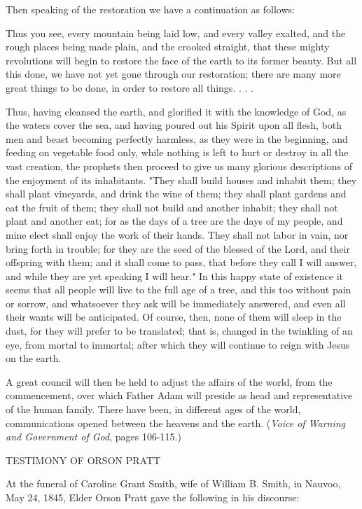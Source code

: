 Then speaking of the restoration we have a continuation as follows:

Thus you see, every mountain being laid low, and every valley exalted, and the rough places
being made plain, and the crooked straight, that these mighty revolutions will begin to restore
the face of the earth to its former beauty. But all this done, we have not yet gone through our
restoration; there are many more great things to be done, in order to restore all things. . . .

Thus, having cleansed the earth, and glorified it with the knowledge of God, as the waters
cover the sea, and having poured out his Spirit upon all flesh, both men and beast becoming
perfectly harmless, as they were in the beginning, and feeding on vegetable food only, while
nothing is left to hurt or destroy in all the vast creation, the prophets then proceed to give us
many glorious descriptions of the enjoyment of its inhabitants. "They shall build houses and
inhabit them; they shall plant vineyards, and drink the wine of them; they shall plant gardens
and eat the fruit of them; they shall not build and another inhabit; they shall not plant and
another eat; for as the days of a tree are the days of my people, and mine elect shall enjoy the
work of their hands. They shall not labor in vain, nor bring forth in trouble; for they are the
seed of the blessed of the Lord, and their offspring with them; and it shall come to pass, that
before they call I will answer, and while they are yet speaking I will hear." In this happy state
of existence it seems that all people will live to the full age of a tree, and this too without
pain or sorrow, and whatsoever they ask will be immediately answered, and even all their
wants will be anticipated. Of course, then, none of them will sleep in the dust, for they will
prefer to be translated; that is, changed in the twinkling of an eye, from mortal to immortal;
after which they will continue to reign with Jesus on the earth.

A great council will then be held to adjust the affairs of the world, from the commencement,
over which Father Adam will preside as head and representative of the human family. There
have been, in different ages of the world, communications opened between the heavens and
the earth. (\textit{Voice of Warning and Government of God}, pages 106-115.)

TESTIMONY OF ORSON PRATT

At the funeral of Caroline Grant Smith, wife of William B. Smith, in Nauvoo, May 24, 1845,
Elder Orson Pratt gave the following in his discourse:

